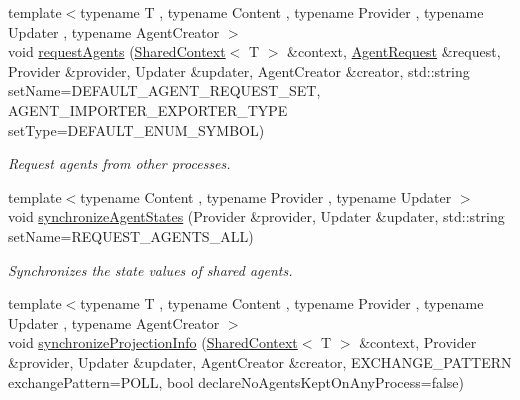 \begin{DoxyCompactItemize}
\item 
{\footnotesize template$<$typename T , typename Content , typename Provider , typename Updater , typename Agent\-Creator $>$ }\\void \hyperlink{classrepast_1_1_repast_process_af295e322c0902a49ce530fc907b698d3}{request\-Agents} (\hyperlink{classrepast_1_1_shared_context}{Shared\-Context}$<$ T $>$ \&context, \hyperlink{classrepast_1_1_agent_request}{Agent\-Request} \&request, Provider \&provider, Updater \&updater, Agent\-Creator \&creator, std\-::string set\-Name=D\-E\-F\-A\-U\-L\-T\-\_\-\-A\-G\-E\-N\-T\-\_\-\-R\-E\-Q\-U\-E\-S\-T\-\_\-\-S\-E\-T, A\-G\-E\-N\-T\-\_\-\-I\-M\-P\-O\-R\-T\-E\-R\-\_\-\-E\-X\-P\-O\-R\-T\-E\-R\-\_\-\-T\-Y\-P\-E set\-Type=D\-E\-F\-A\-U\-L\-T\-\_\-\-E\-N\-U\-M\-\_\-\-S\-Y\-M\-B\-O\-L)
\begin{DoxyCompactList}\small\item\em Request agents from other processes. \end{DoxyCompactList}\item 
{\footnotesize template$<$typename Content , typename Provider , typename Updater $>$ }\\void \hyperlink{classrepast_1_1_repast_process_a6bf1b59d9939755fedc53264fdb335db}{synchronize\-Agent\-States} (Provider \&provider, Updater \&updater, std\-::string set\-Name=R\-E\-Q\-U\-E\-S\-T\-\_\-\-A\-G\-E\-N\-T\-S\-\_\-\-A\-L\-L)
\begin{DoxyCompactList}\small\item\em Synchronizes the state values of shared agents. \end{DoxyCompactList}\item 
\hypertarget{classrepast_1_1_repast_process_ac630e9787be913cb1101fcba3d6c60a7}{{\footnotesize template$<$typename T , typename Content , typename Provider , typename Updater , typename Agent\-Creator $>$ }\\void \hyperlink{classrepast_1_1_repast_process_ac630e9787be913cb1101fcba3d6c60a7}{synchronize\-Projection\-Info} (\hyperlink{classrepast_1_1_shared_context}{Shared\-Context}$<$ T $>$ \&context, Provider \&provider, Updater \&updater, Agent\-Creator \&creator, E\-X\-C\-H\-A\-N\-G\-E\-\_\-\-P\-A\-T\-T\-E\-R\-N exchange\-Pattern=P\-O\-L\-L, bool declare\-No\-Agents\-Kept\-On\-Any\-Process=false)}\label{classrepast_1_1_repast_process_ac630e9787be913cb1101fcba3d6c60a7}


\end{DoxyCompactItemize}
